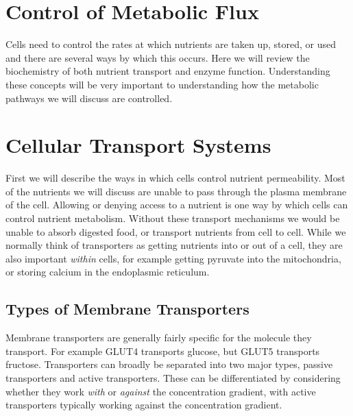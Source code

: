 \documentclass{tufte-handout}
\begin{document}
\section{Control of Metabolic Flux}

Cells need to control the rates at which nutrients are taken up, stored, or used and there are several ways by which this occurs.  Here we will review the biochemistry of both nutrient transport and enzyme function.  Understanding these concepts will be very important to understanding how the metabolic pathways we will discuss are controlled. 

\section{Cellular Transport Systems}

First we will describe the ways in which cells control nutrient permeability.  Most of the nutrients we will discuss are unable to pass through the plasma membrane of the cell.  Allowing or denying access to a nutrient is one way by which cells can control nutrient metabolism.  Without these transport mechanisms we would be unable to absorb digested food, or transport nutrients from cell to cell.  While we normally think of transporters as getting nutrients into or out of a cell, they are also important \emph{within} cells, for example getting pyruvate into the mitochondria, or storing calcium in the endoplasmic reticulum.

\subsection{Types of Membrane Transporters}

Membrane transporters are generally fairly specific for the molecule they transport.  For example GLUT4 transports glucose, but GLUT5 transports fructose.  Transporters can broadly be separated into two major types, passive transporters and active transporters.  These can be differentiated by considering whether they work \emph{with} or \emph{against} the concentration gradient, with active transporters typically working against the concentration gradient.
\end{document}
